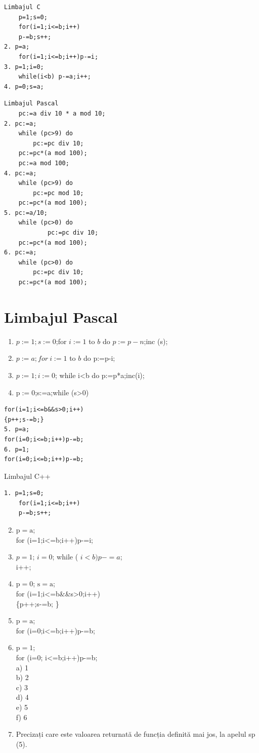 \documentclass[10pt]{article}
\begin{document}
\begin{verbatim}
Limbajul C
    p=1;s=0;
    for(i=1;i<=b;i++)
    p-=b;s++;
2. p=a;
    for(i=1;i<=b;i++)p-=i;
3. p=1;i=0;
    while(i<b) p-=a;i++;
4. p=0;s=a;
\end{verbatim}

\begin{verbatim}
Limbajul Pascal
    pc:=a div 10 * a mod 10;
2. pc:=a;
    while (pc>9) do
        pc:=pc div 10;
    pc:=pc*(a mod 100);
    pc:=a mod 100;
4. pc:=a;
    while (pc>9) do
        pc:=pc mod 10;
    pc:=pc*(a mod 100);
5. pc:=a/10;
    while (pc>0) do
            pc:=pc div 10;
    pc:=pc*(a mod 100);
6. pc:=a;
    while (pc>0) do
        pc:=pc div 10;
    pc:=pc*(a mod 100);
\end{verbatim}

\section*{Limbajul Pascal}
\begin{enumerate}
  \item $p:=1 ; s:=0$;for $i:=1$ to $b$ do $p:=p-n$;inc (s);
  \item $p:=a ; f o r ~ i:=1$ to $b$ do p:=p-i;
  \item $p:=1 ; i:=0$; while i<b do p:=p*a;inc(i);
  \item $\mathrm{p}:=0$;s:=a;while (s>0)
\end{enumerate}

\begin{verbatim}
for(i=1;i<=b&&s>0;i++)
{p++;s-=b;}
5. p=a;
for(i=0;i<=b;i++)p-=b;
6. p=1;
for(i=0;i<=b;i++)p-=b;
\end{verbatim}

Limbajul C++

\begin{verbatim}
1. p=1;s=0;
    for(i=1;i<=b;i++)
    p-=b;s++;
\end{verbatim}

\begin{enumerate}
  \setcounter{enumi}{1}
  \item $\mathrm{p}=\mathrm{a}$;\\
for (i=1;i<=b;i++)p-=i;
  \item $p=1$; $i=0$; while ( $i<b) p-=a$;\\
i++;
  \item $\mathrm{p}=0$; $\mathrm{s}=\mathrm{a}$;\\
for (i=1;i<=b\&\&s>0;i++)\\
\{p++;s-=b; \}
  \item $\mathrm{p}=\mathrm{a}$;\\
for (i=0;i<=b;i++)p-=b;
  \item $\mathrm{p}=1$;\\
for (i=0; i<=b;i++)p-=b;\\
a) 1\\
b) 2\\
c) 3\\
d) 4\\
e) 5\\
f) 6
  \item Precizați care este valoarea returnată de funcția definită mai jos, la apelul sp (5).
\end{enumerate}
\end{document}
